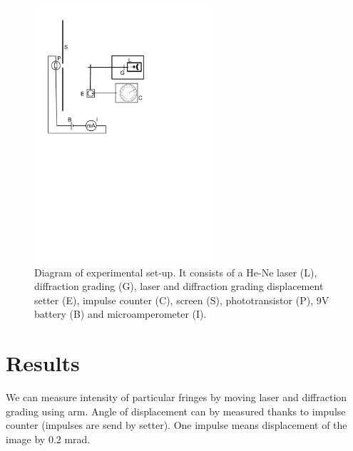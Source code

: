 \documentclass[a4paper,12pt]{article}
\begin{document}
\begin{figure}[H]
\begin{center}
    \includegraphics[width=0.6\textwidth]{set-up}
    \caption{Diagram of experimental set-up. It consists of a He-Ne laser (L), diffraction grading (G), laser and diffraction grading displacement setter (E), impulse counter (C), screen (S), phototransistor (P), 9V battery (B) and microamperometer (I).}
    \label{fig:set-up}
\end{center}
\end{figure}

\section{Results}
We can measure intensity of particular fringes by moving laser and diffraction grading using arm. Angle of displacement can by measured thanks to impulse counter (impulses are send by setter). One impulse means displacement of the image by 0.2 mrad. 
\end{document}
